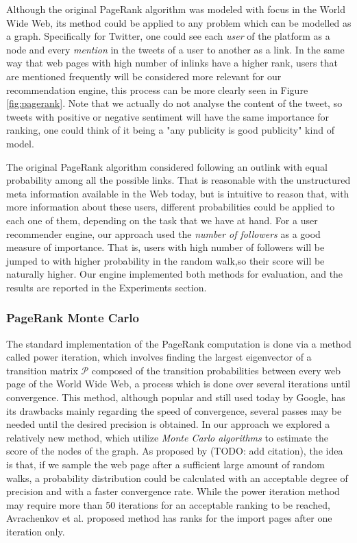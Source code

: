 Although the original PageRank algorithm was modeled with focus in the World Wide Web, its method could be applied to any problem which can be modelled as a graph. Specifically for Twitter, one could see each \emph{user} of the platform as a node and every \emph{mention} in the tweets of a user to another as a link. In the same way that web pages with high number of inlinks have a higher rank, users that are mentioned frequently will be considered more relevant for our recommendation engine, this process can be more clearly seen in Figure \ref{fig:pagerank}. Note that we actually do not analyse the content of the tweet, so tweets with positive or negative sentiment will have the same importance for ranking, one could think of it being a "any publicity is good publicity" kind of model. 

The original PageRank algorithm considered following an outlink with equal probability among all the possible links. That is reasonable with the unstructured meta information available in the Web today, but is intuitive to reason that, with more information about these users, different probabilities could be applied to each one of them, depending on the task that we have at hand. For a user recommender engine, our approach used the \emph{number of followers} as a good measure of importance. That is, users with high number of followers will be jumped to with higher probability in the random walk,so their score will be naturally higher. Our engine implemented both methods for evaluation, and the results are reported in the Experiments section.

\subsubsection{PageRank Monte Carlo}

The standard implementation of the PageRank computation is done via a method called power iteration, which involves finding the largest eigenvector of a transition matrix $\mathcal{P}$ composed of the transition probabilities between every web page of the World Wide Web, a process which is done over several iterations until convergence. This method, although popular and still used today by Google, has its drawbacks mainly regarding the speed of convergence, several passes may be needed until the desired precision is obtained. In our approach we explored a relatively new method, which utilize \emph{Monte Carlo algorithms} to estimate the score of the nodes of the graph. As proposed by (TODO: add citation), the idea is that, if we sample the web page after a sufficient large amount of random walks, a probability distribution could be calculated with an acceptable degree of precision and with a faster convergence rate. While the power iteration method may require more than 50 iterations for an acceptable ranking to be reached, Avrachenkov et al. proposed method has ranks for the import pages after one iteration only.

